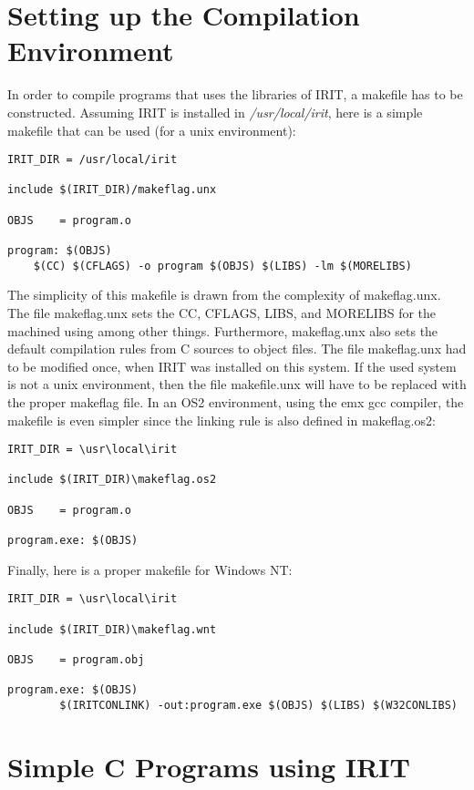 {\section{Setting up the Compilation Environment}

In order to compile programs that uses the libraries of IRIT, a makefile
has to be constructed. Assuming IRIT is installed in {\em /usr/local/irit},
here is a simple makefile that can be used (for a unix environment):

\begin{verbatim}
IRIT_DIR = /usr/local/irit

include $(IRIT_DIR)/makeflag.unx

OBJS	= program.o

program: $(OBJS)
	$(CC) $(CFLAGS) -o program $(OBJS) $(LIBS) -lm $(MORELIBS)
\end{verbatim}

The simplicity of this makefile is drawn from the complexity of
makeflag.unx. The file makeflag.unx sets the CC, CFLAGS, LIBS, and
MORELIBS for the machined using among other things. Furthermore,
makeflag.unx also sets the default compilation rules from C sources to
object files.  The file makeflag.unx had to be modified once, when
IRIT was installed on this system. If the used system is not a unix
environment, then the file makefile.unx will have to be replaced with
the proper makeflag file.  In an OS2 environment, using the emx gcc
compiler, the makefile is even simpler since the linking rule is also
defined in makeflag.os2:

\begin{verbatim}
IRIT_DIR = \usr\local\irit

include $(IRIT_DIR)\makeflag.os2

OBJS	= program.o

program.exe: $(OBJS)
\end{verbatim}

Finally, here is a proper makefile for Windows NT:

\begin{verbatim}
IRIT_DIR = \usr\local\irit

include $(IRIT_DIR)\makeflag.wnt

OBJS	= program.obj

program.exe: $(OBJS)
        $(IRITCONLINK) -out:program.exe $(OBJS) $(LIBS) $(W32CONLIBS)
\end{verbatim}

\section{Simple C Programs using IRIT}

}
